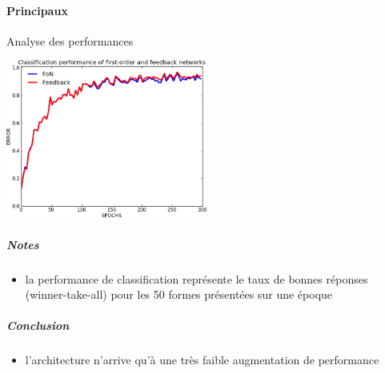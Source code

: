     \paragraph{Principaux}
      Analyse des performances
      \begin{center}
	\includegraphics[width=250px]{data/expD2/perff.png}
      \end{center}
      \subparagraph{Notes}
	\begin{itemize}
	  \item la performance de classification représente le taux de bonnes réponses (winner-take-all) pour les 50 formes présentées sur une époque
	\end{itemize}
      \subparagraph{Conclusion}
	\begin{itemize}
	  \item l'architecture n'arrive qu'à une très faible augmentation de performance
	\end{itemize}
